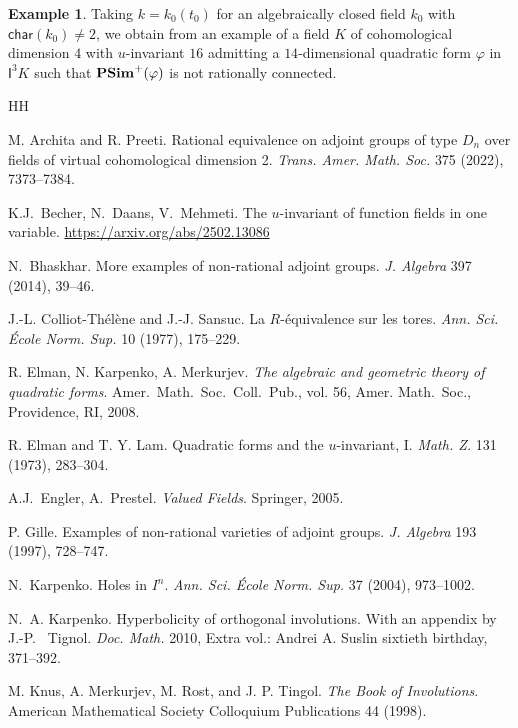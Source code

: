\documentclass[twoside,11pt]{amsart}
\numberwithin{equation}{section}
\theoremstyle{definition}
\newtheorem{ex}[equation]{Example}
\newcommand{\car}{\mathsf{char}}
\newcommand{\I}{\mathsf{I}}
\begin{document}
\begin{ex}
    Taking $k=k_0(t_0)$ for an algebraically closed field $k_0$ with $\car(k_0)\neq 2$, we obtain from  an example of a field $K$ of cohomological dimension $4$ with $u$-invariant $16$ admitting a $14$-dimensional quadratic form $\varphi$ in $\I^3K$ such that ${\bf PSim}^+(\varphi)$ is not rationally connected.
\end{ex}




\begin{thebibliography}{HH}

M. Archita and R. Preeti.
Rational equivalence on adjoint groups of type $D_n$ over fields of virtual cohomological dimension 2. \emph{Trans. Amer. Math. Soc.} {375} (2022), 7373--7384.

K.J.~Becher, N.~Daans, V.~Mehmeti. The $u$-invariant of function fields in one variable. \url{https://arxiv.org/abs/2502.13086}

 N.~Bhaskhar. More examples of non-rational adjoint groups. \emph{J. Algebra} 397 (2014), 39--46. 

J.-L. Colliot-Th\'el\`ene and J.-J. Sansuc.
La $R$-\'equivalence sur les tores.
\emph{Ann. Sci. \'Ecole Norm. Sup.} 10 (1977), 175--229.

R. Elman, N. Karpenko, A. Merkurjev. 
{\em The algebraic and geometric theory of quadratic forms}. 
Amer.~Math.~Soc.~Coll.~Pub., vol. {56}, Amer. Math.~Soc., Providence, RI, 2008.

R. Elman and T. Y. Lam. Quadratic forms and the $u$-invariant, I. \emph{Math. Z.} 131 (1973), 283--304.

A.J.~Engler, A.~Prestel. \emph{Valued Fields}. Springer, 2005.

P. Gille. Examples of non-rational varieties of adjoint groups. \emph{J. Algebra} {193} (1997), 728--747.

N.~Karpenko. Holes in $I^n$. \emph{Ann. Sci. École Norm. Sup.} 37 (2004), 973--1002.

N.~A. Karpenko. Hyperbolicity of orthogonal involutions. With an appendix by J.-P.~ Tignol. \emph{Doc. Math.} {2010}, Extra vol.: Andrei A. Suslin sixtieth birthday, 371--392.

 M. Knus, A. Merkurjev, M. Rost, and J. P. Tingol. \emph{The Book of Involutions}. American Mathematical Society Colloquium Publications 44 (1998).


\end{thebibliography}
\end{document}
